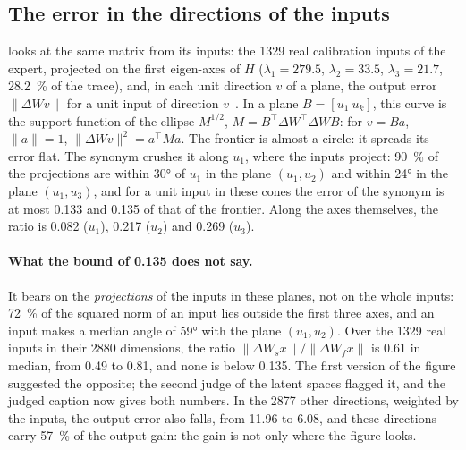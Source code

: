 \begin{figure}[tbp]
\centering
\GrapheLatentsRangee
{}
\label{fig:t3-lat-rangee}
\end{figure}

\subsection{The error in the directions of the inputs}\label{t3sno:sec:nuage}

 looks at the same matrix from its inputs: the \num{1329} real calibration inputs of the expert, projected on the first eigen-axes of $H$ ($\lambda_1 = \num{279.5}$, $\lambda_2 = \num{33.5}$, $\lambda_3 = \num{21.7}$, \SI{28.2}{\percent} of the trace), and, in each unit direction $v$ of a plane, the output error $\lVert \Delta W v \rVert$ for a unit input of direction $v$ \mes\,\calc. In a plane $B = [u_1\ u_k]$, this curve is the support function of the ellipse $M^{1/2}$, $M = B^\top \Delta W^\top \Delta W B$: for $v = B a$, $\lVert a \rVert = 1$, $\lVert \Delta W v\rVert^2 = a^\top M a$. The frontier is almost a circle: it spreads its error flat. The synonym crushes it along $u_1$, where the inputs project: \SI{90}{\percent} of the projections are within \ang{30} of $u_1$ in the plane $(u_1, u_2)$ and within \ang{24} in the plane $(u_1, u_3)$, and for a unit input in these cones the error of the synonym is at most \num{0.133} and \num{0.135} of that of the frontier. Along the axes themselves, the ratio is \num{0.082} ($u_1$), \num{0.217} ($u_2$) and \num{0.269} ($u_3$).

\paragraph{What the bound of \num{0.135} does not say.} It bears on the \emph{projections} of the inputs in these planes, not on the whole inputs: \SI{72}{\percent} of the squared norm of an input lies outside the first three axes, and an input makes a median angle of \ang{59} with the plane $(u_1, u_2)$. Over the \num{1329} real inputs in their \num{2880} dimensions, the ratio $\lVert \Delta W_s x\rVert / \lVert \Delta W_f x\rVert$ is \num{0.61} in median, from \num{0.49} to \num{0.81}, and none is below \num{0.135}. The first version of the figure suggested the opposite; the second judge of the latent spaces flagged it, and the judged caption now gives both numbers. In the \num{2877} other directions, weighted by the inputs, the output error also falls, from \num{11.96} to \num{6.08}, and these directions carry \SI{57}{\percent} of the output gain: the gain is not only where the figure looks.

